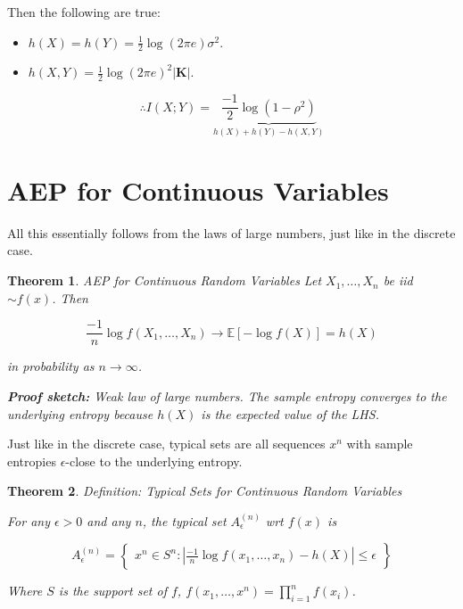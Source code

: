\documentclass[a4paper,12pt]{report}
\newtheorem{theorem}{Theorem}
\begin{document}
Then the following are true: 
\begin{itemize}
\item $h(X) = h(Y) = \frac 1 2 \log (2 \pi e)\sigma^2$.
\item $h(X, Y) = \frac{1}{2} \log (2\pi e)^2 |\mathbf K|$.
\end{itemize}
\begin{equation}
	\therefore I(X; Y) = \underbrace{
		\frac{-1}{2} \log (1-\rho^2)
	}_{
		h(X) + h(Y) - h(X,Y)
	}
\end{equation}














\section{AEP for Continuous Variables}

All this essentially follows from the laws of large numbers, just like in the
discrete case. 

\begin{theorem}{AEP for Continuous Random Variables}
Let $X_1, \dots, X_n$ be iid $\sim f(x)$. Then 

\begin{equation}
	\frac{-1}{n} \log f(X_1, \dots, X_n) \to \mathbb E[-\log f(X)] = h(X)
\end{equation}

in probability as $n\to \infty$.

\textbf{Proof sketch:} Weak law of large numbers. The sample entropy converges
to the underlying entropy because $h(X)$ is the expected value of the LHS.
\end{theorem}



Just like in the discrete case, typical sets are all sequences $x^n$ with sample
entropies $\epsilon$-close to the underlying entropy.


\begin{theorem}{Definition: Typical Sets for Continuous Random Variables}

For any $\epsilon > 0$ and any $n$, the typical set $A_\epsilon^{(n)}$ wrt
$f(x)$ is 

\begin{equation}
	A_\epsilon^{(n)} = \begin{Bmatrix}
		x^n \in S^n : \left|  
			\frac {-1} n \log f(x_1, \dots, x_n) - h(X) 
		\right|
		\leq \epsilon
	\end{Bmatrix}
\end{equation}

Where $S$ is the support set of $f$, $f(x_1, \dots, x^n) = \prod_{i=1}^n
f(x_i)$.
\end{theorem}
\end{document}
